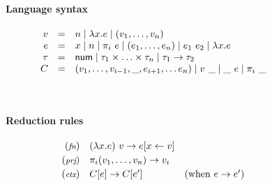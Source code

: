 %
%


\begin{figure}[t]
\paragraph{Language syntax}  
\begin{equation*}
\begin{array}{rcl}
  v &  = & n \; | \; \lambda x.e \; | \; (v_1, \ldots, v_n) \\
  e &  = & x \; | \; n \; | \; \pi_i~e \; | \; (e_1, \ldots, e_n) \; | \; e_1~e_2 \; | \; \lambda x.e \\
  \tau &  = & \textnormal{\sffamily num} \; | \; \tau_1 \times \ldots \times \tau_n \; | \; \tau_1 \rightarrow \tau_2 \\
  C  & = & (v_1, \ldots, v_{i-1}, \_, e_{i+1}, \ldots e_n) \; | \; v~\_ \; | \; \_~e \; | \; \pi_i~\_   
\end{array}
\end{equation*}

~
\paragraph{Reduction rules}
\begin{equation*}
\begin{array}{rll}
  \footnotesize{(\emph{fn})}  & (\lambda x.e)~v \rightarrow e[x\leftarrow v] \\[0.25em]
  \footnotesize{(\emph{prj})} & \pi_i (v_1, \ldots, v_n) \rightarrow v_i\\[0.25em]
  \footnotesize{(\emph{ctx})}  & C[e] \rightarrow C[e']  & (\textnormal{when}~e\rightarrow e')\\[0.25em]
\end{array}
\end{equation*}

~

\end{figure}
